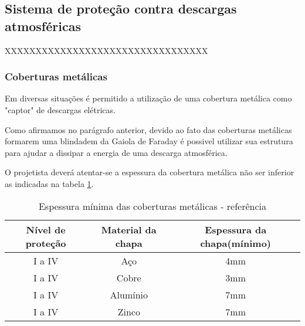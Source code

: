 \subsection{Sistema de proteção contra descargas atmosféricas} \label{subsection: spda}

XXXXXXXXXXXXXXXXXXXXXXXXXXXXXXXXX

\subsubsection{Coberturas metálicas}

Em diversas situações é permitido a utilização de uma cobertura metálica como "captor" de descargas elétricas.

Como afirmamos no parágrafo anterior, devido ao fato das coberturas metálicas formarem uma blindadem da Gaiola de Faraday é possivel utilizar sua estrutura para ajudar a dissipar a energia de uma descarga atmosférica.

O projetista deverá atentar-se a espessura da cobertura metálica não ser inferior as indicadas na tabela \ref{table: espessura chapa}.

\begin{table}[ht]
	\centering
	\caption{Espessura mínima das coberturas metálicas - referência \cite{2015aterramento}}
	\begin{tabular}[t]{ccc}
		\toprule
		\color{Tue-red}\textbf{Nível de proteção}&\color{Tue-red}\textbf{Material da chapa}&\color{Tue-red}\textbf{Espessura da chapa(mínimo)}\\
		\midrule
		I a IV&Aço&4mm\\
		I a IV&Cobre&3mm\\
		I a IV&Alumínio&7mm\\
		I a IV&Zinco&7mm\\
		\bottomrule
	\end{tabular}
	\label{table: espessura chapa}
\end{table}


%

%

%
\newpage
